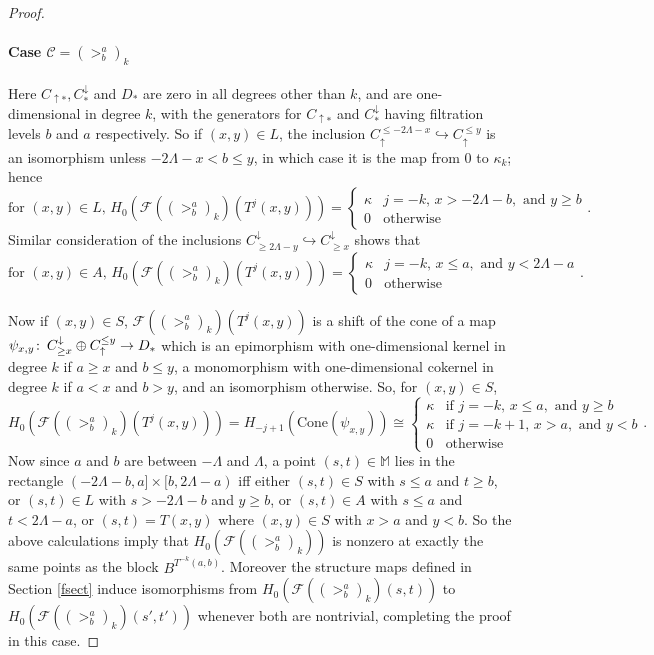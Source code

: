 \documentclass[11pt]{amsart}
\theoremstyle{definition}
\theoremstyle{remark}
\numberwithin{equation}{section}
\def\co{\colon\thinspace}
\begin{document}
\begin{proof}
\paragraph{\textbf{Case} $\mathcal{C}=(>_{b}^{a})_k$} Here $C_{\uparrow*},C^{\downarrow}_{*}$ and $D_*$ are zero in all degrees other than $k$, and are one-dimensional in degree $k$, with the generators for $C_{\uparrow*}$ and $C^{\downarrow}_{*}$ having filtration levels $b$ and $a$ respectively.  So if $(x,y)\in L$, the inclusion $C_{\uparrow}^{\leq -2\Lambda-x}\hookrightarrow C_{\uparrow}^{\leq y}$ is an isomorphism unless $-2\Lambda-x<b\leq y$, in which case it is the map from $0$ to $\kappa_k$; hence
 \[ \mbox{for }(x,y)\in L,\,H_0\left(\mathcal{F}((>_{b}^{a})_k)(T^{j}(x,y))\right) = \left\{\begin{array}{ll}\kappa & j=-k,\,x>-2\Lambda-b,\mbox{ and }y\geq b \\ 0 & \mbox{otherwise}\end{array}\right..\]  
 Similar consideration of the inclusions $C^{\downarrow}_{\geq 2\Lambda-y}\hookrightarrow C^{\downarrow}_{\geq x}$ shows that \[ \mbox{for }(x,y)\in A,\,H_0\left(\mathcal{F}((>_{b}^{a})_k)(T^{j}(x,y))\right) = \left\{\begin{array}{ll}\kappa & j=-k,\,x\leq a,\mbox{ and }y<2\Lambda-a \\ 0 & \mbox{otherwise}\end{array}\right..\] 

Now if $(x,y)\in S$, $\mathcal{F}((>_{b}^{a})_k)(T^{j}(x,y))$ is a shift of the cone of a map $\psi_{x,y}\co C^{\downarrow}_{\geq x}\oplus C_{\uparrow}^{\leq y}\to D_*$ which is an epimorphism with one-dimensional kernel in degree $k$ if $a\geq x$ and $b\leq y$, a monomorphism with one-dimensional cokernel in degree $k$ if $a<x$ and $b>y$, and an isomorphism otherwise.  So, for $(x,y)\in S$, \[ H_0\left(\mathcal{F}((>_{b}^{a})_k)(T^{j}(x,y))\right)=H_{-j+1}(\mathrm{Cone}(\psi_{x,y}))\cong \left\{\begin{array}{ll}\kappa & \mbox{if }j=-k,\,x\leq a,\mbox{ and }y\geq b \\ \kappa & \mbox{if }j=-k+1,\, x>a,\mbox{ and }y<b \\ 0 & \mbox{otherwise}  \end{array}\right.. \]  
Now since $a$ and $b$ are between $-\Lambda$ and $\Lambda$, a point $(s,t)\in\mathbb{M}$ lies in the rectangle $(-2\Lambda-b,a]\times [b,2\Lambda-a)$ iff either $(s,t)\in S$ with $s\leq a$ and $t\geq b$, or $(s,t)\in L$ with $s>-2\Lambda-b$ and $y\geq b$, or $(s,t)\in A$ with $s\leq a$ and $t<2\Lambda-a$, or $(s,t)=T(x,y)$ where $(x,y)\in S$ with $x>a$ and $y<b$.  So the above calculations imply that  $H_0\left(\mathcal{F}((>_{b}^{a})_k)\right)$ is nonzero at exactly the same points as the block $B^{T^{-k}(a,b)}$.  Moreover the structure maps defined in Section \ref{fsect} induce isomorphisms from $H_0\left(\mathcal{F}((>_{b}^{a})_k)(s,t)\right)$ to $H_0\left(\mathcal{F}((>_{b}^{a})_k)(s',t')\right)$ whenever both are nontrivial, completing the proof in this case.  


\end{proof}
\end{document}
